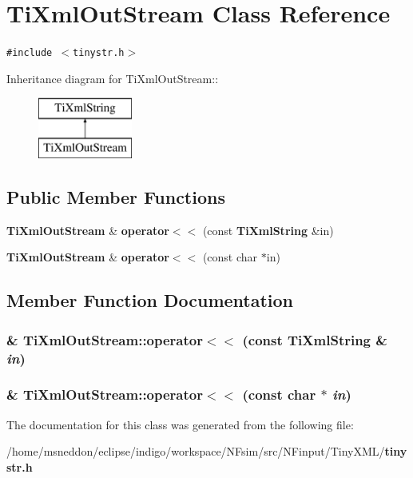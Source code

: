 \section{TiXmlOutStream Class Reference}
\label{classTiXmlOutStream}
{\tt \#include $<$tinystr.h$>$}

Inheritance diagram for TiXmlOutStream::\begin{figure}[H]
\begin{center}
\leavevmode
\includegraphics[height=2cm]{classTiXmlOutStream}
\end{center}
\end{figure}
\subsection*{Public Member Functions}
\begin{CompactItemize}
\item 
{\bf TiXmlOutStream} \& {\bf operator$<$$<$} (const {\bf TiXmlString} \&in)
\item 
{\bf TiXmlOutStream} \& {\bf operator$<$$<$} (const char $\ast$in)
\end{CompactItemize}


\subsection{Member Function Documentation}
\subsubsection{\& TiXmlOutStream::operator$<$$<$ (const {\bf TiXmlString} \& {\em in})\hspace{0.3cm}{\tt  [inline]}}\label{classTiXmlOutStream_3640dcb1c0903be3bc6966cdc9a79db6}


\subsubsection{\& TiXmlOutStream::operator$<$$<$ (const char $\ast$ {\em in})\hspace{0.3cm}{\tt  [inline]}}\label{classTiXmlOutStream_f2117e5a8cbfcb69544804ad2859bfb6}




The documentation for this class was generated from the following file:\begin{CompactItemize}
\item 
/home/msneddon/eclipse/indigo/workspace/NFsim/src/NFinput/TinyXML/{\bf tinystr.h}\end{CompactItemize}
